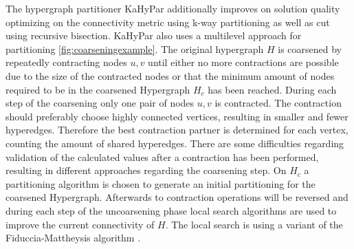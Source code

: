 \documentclass[a4paper,12pt,bibtotoc,titlepage, liststotoc,BCOR7mm,headsepline,pointlessnumbers]{scrbook}
\numberwithin{equation}{section}
\begin{document}
The hypergraph partitioner KaHyPar additionally improves on solution quality optimizing on the connectivity metric using k-way partitioning \cite{akhremtsev2017engineering} as well as cut using recursive bisection\cite{schlag2016k}.  
KaHyPar also uses a multilevel approach for partitioning \ref{fig:coarseningexample}. The original hypergraph $H$ is coarsened by repeatedly contracting nodes $u,v$ until either no more contractions are possible due to the size of the contracted nodes or that the minimum amount of nodes required to be in the coarsened Hypergraph $H_c$ has been reached. During each step of the coarsening only one pair of nodes $u, v$ is contracted. The contraction should preferably choose highly connected vertices, resulting in smaller and fewer hyperedges. Therefore the best contraction partner is determined for each vertex, counting the amount of shared hyperedges. There are some difficulties regarding validation of the calculated values after a contraction has been performed, resulting in different approaches regarding the coarsening step.
On $H_c$ a partitioning algorithm is chosen to generate an initial partitioning for the coarsened Hypergraph. Afterwards to contraction operations will be reversed and 
during each step of the uncoarsening phase local search algorithms are used to improve the current connectivity of $H$. The local search is using a variant of the Fiduccia-Mattheysis algorithm \cite{fiduccia1988linear}. 
\newline
\end{document}
